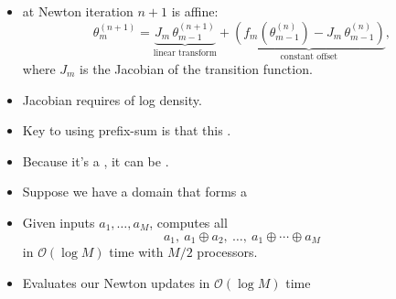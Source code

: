 \documentclass[10pt]{report}
\begin{document}
\begin{itemize}
\item {} at Newton iteration $n +
  1$ is affine:
  $$
  \theta_m^{(n + 1)}
  = \underbrace{J_m \, \theta_{m-1}^{(n + 1)}}_{\text{linear transform}}
  + \underbrace{\left( f_m(\theta^{(n)}_{m - 1})
      - J_m \, \theta^{(n)}_{m-1}
  \right)}_{\text{constant offset}},
  $$
  where $J_m$ is the Jacobian of the transition function.
\item Jacobian requires  of log density.
\item Key to using prefix-sum is that this .
\item Because it's a , it can be .
\end{itemize}

\begin{itemize}
\item Suppose we have a domain that forms a 
\item  Given inputs $a_1, \ldots, a_M$, 
  computes all 
  $$a_1,\ a_1 \oplus a_2,\ \ldots,\ a_1 \oplus \cdots \oplus a_M$$
  in $\mathcal{O}(\log M)$ time with $M / 2$ processors.
\item Evaluates our Newton updates in $\mathcal{O}(\log M)$ time
\end{itemize}
\end{document}
